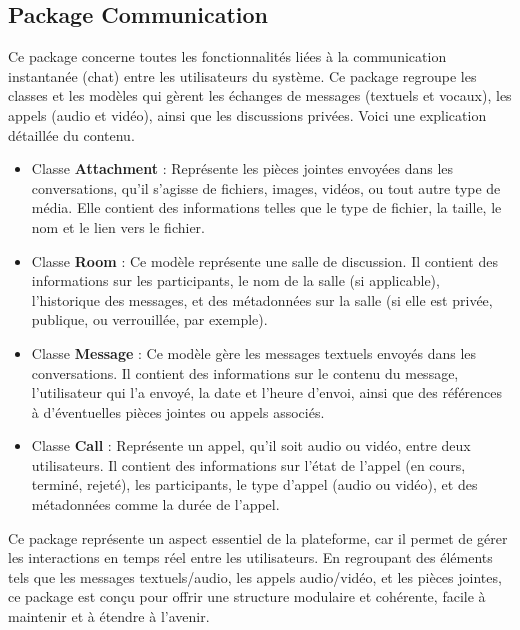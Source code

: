 \subsection{Package Communication} \label{subsection_package_communication}
Ce package concerne toutes les fonctionnalités liées à la communication instantanée (chat) entre les utilisateurs du système. Ce package regroupe les classes et les modèles qui gèrent les échanges de messages (textuels et vocaux), les appels (audio et vidéo), ainsi que les discussions privées. Voici une explication détaillée du contenu.

\begin{itemize}
    \item Classe \textbf{Attachment} : Représente les pièces jointes envoyées dans les conversations, qu'il s'agisse de fichiers, images, vidéos, ou tout autre type de média. Elle contient des informations telles que le type de fichier, la taille, le nom et le lien vers le fichier.

    \item Classe \textbf{Room} : Ce modèle représente une salle de discussion. Il contient des informations sur les participants, le nom de la salle (si applicable), l'historique des messages, et des métadonnées sur la salle (si elle est privée, publique, ou verrouillée, par exemple).

    \item Classe \textbf{Message} : Ce modèle gère les messages textuels envoyés dans les conversations. Il contient des informations sur le contenu du message, l'utilisateur qui l'a envoyé, la date et l'heure d'envoi, ainsi que des références à d'éventuelles pièces jointes ou appels associés.

    \item Classe \textbf{Call} : Représente un appel, qu'il soit audio ou vidéo, entre deux utilisateurs. Il contient des informations sur l'état de l'appel (en cours, terminé, rejeté), les participants, le type d'appel (audio ou vidéo), et des métadonnées comme la durée de l'appel.
\end{itemize}

\vspace{0.35cm}

Ce package représente un aspect essentiel de la plateforme, car il permet de gérer les interactions en temps réel entre les utilisateurs. En regroupant des éléments tels que les messages textuels/audio, les appels audio/vidéo, et les pièces jointes, ce package est conçu pour offrir une structure modulaire et cohérente, facile à maintenir et à étendre à l'avenir.

